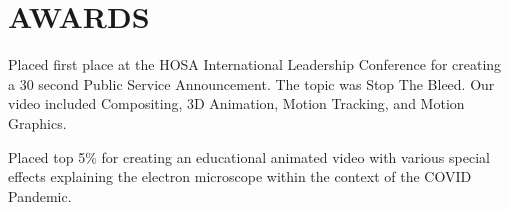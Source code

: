 \documentclass[]{main}
\begin{document}
\begin{minipage}[t]{0.66\textwidth}
\section{AWARDS}
Placed first place at the HOSA International Leadership Conference for creating a 30 second Public Service Announcement. The topic was Stop The Bleed. Our video included Compositing, 3D Animation, Motion Tracking, and Motion Graphics.
\sectionsep

Placed top 5\% for creating an educational animated video with various special effects explaining the electron microscope within the context of the COVID Pandemic.
\sectionsep


\sectionsep



\end{minipage} 
\end{document}
